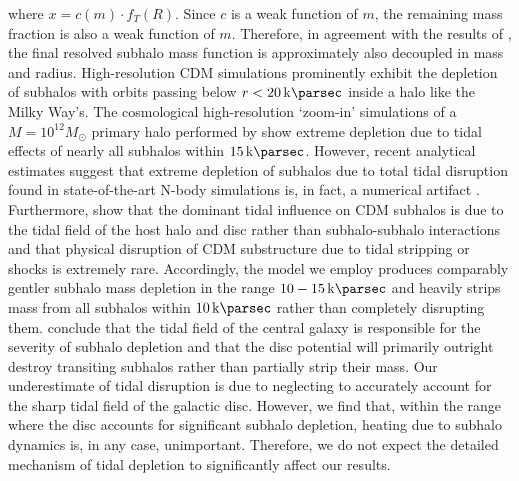 \documentclass[usenatbib]{mnras}
\begin{document}
where $x = c(m) \cdot f_T(R)$. Since $c$ is a weak function of $m$, the remaining mass fraction is also a weak function of $m$. Therefore, in agreement with the results of \citet{unified_model}, the final resolved subhalo mass function is approximately also decoupled in mass and radius. High-resolution CDM simulations prominently exhibit the depletion of subhalos with orbits passing below $r < \SI{20}{\kilo \parsec}$ inside a halo like the Milky Way's. The cosmological high-resolution `zoom-in' simulations of a $M = 10^{12} M_{\odot}$ primary halo performed by \cite{subhalo_truncation_sims} show extreme depletion due to tidal effects of nearly all subhalos within $\SI{15}{\kilo\parsec}$. However, recent analytical estimates suggest that extreme depletion of subhalos due to total tidal disruption found in state-of-the-art N-body simulations is, in fact, a numerical artifact \citep{dark_matter_substructure_numerics}. Furthermore, \cite{disruption_numerics} show that the dominant tidal influence on CDM subhalos is due to the tidal field of the host halo and disc rather than subhalo-subhalo interactions and that physical disruption of CDM substructure due to tidal stripping or shocks is extremely rare. Accordingly, the model we employ produces comparably gentler subhalo mass depletion in the range $10 - \SI{15}{\kilo \parsec}$ and heavily strips mass from all subhalos within $\SI{10}{\kilo\parsec}$ rather than completely disrupting them. \cite{subhalo_truncation_sims} conclude that the tidal field of the central galaxy is responsible for the severity of subhalo depletion and that the disc potential will primarily outright destroy transiting subhalos rather than partially strip their mass. Our underestimate of tidal disruption is due to neglecting to accurately account for the sharp tidal field of the galactic disc. However, we find that, within the range where the disc accounts for significant subhalo depletion, heating due to subhalo dynamics is, in any case, unimportant. Therefore, we do not expect the detailed mechanism of tidal depletion to significantly affect our results. 
\end{document}
